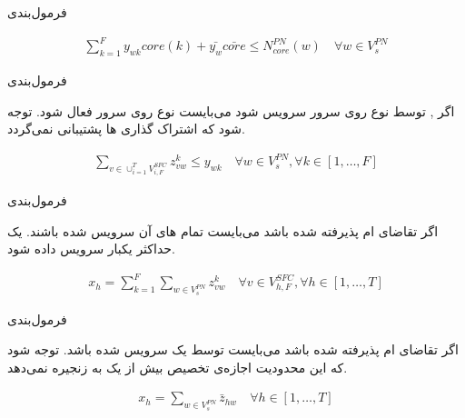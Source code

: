 \documentclass{beamer}
\begin{document}
\begin{persian}
\begin{frame}{فرمول‌بندی}
\begin{latin}
\begin{align}
    \sum_{k=1}^F y_{wk} core(k) + \bar{y_w} \bar{core} \le N_{core}^{PN}(w)
    \quad
    \forall w \in V_s^{PN}
    \end{align}\end{latin}
\end{frame}
\begin{frame}{فرمول‌بندی} %
    \par
    اگر , 
    توسط  نوع 
    روی سرور  سرویس شود می‌بایست
     نوع 
    روی سرور  فعال شود.
    توجه شود که
    اشتراک گذاری ها پشتیبانی نمی‌گردد.
    \begin{latin}\begin{align}
    \sum_{v \in \cup_{i=1}^T V_{i, F}^{SFC}} z_{vw}^k \le y_{wk}
    \quad
    \forall w \in V_s^{PN}, \forall k \in [1,\ldots, F]
    \end{align}\end{latin}
\end{frame}
\begin{frame}{فرمول‌بندی} %
    \par
    اگر تقاضای ام پذیرفته شده باشد
    می‌بایست تمام های آن‌
    سرویس شده باشند.
    یک  حداکثر یکبار سرویس داده شود.
    \begin{latin}\begin{align}
        x_h = \sum_{k=1}^{F} \sum_{w \in V_{s}^{PN}} z_{vw}^{k}
        \quad
        \forall v \in V_{h,F}^{SFC}, \forall h \in [1,\ldots, T]
    \end{align}\end{latin}
\end{frame}
\begin{frame}{فرمول‌بندی} %
    \par
    اگر تقاضای ام پذیرفته شده باشد
    می‌بایست توسط یک  سرویس شده باشد.
    توجه شود که این محدودیت اجازه‌ی تخصیص بیش از یک 
    به زنجیره نمی‌دهد.
    \begin{latin}\begin{align}
        x_h = \sum_{w \in V_{s}^{PN}} \bar{z}_{hw}
        \quad
        \forall h \in [1,\ldots, T]
    \end{align}\end{latin}
\end{frame}

\end{persian}
\end{document}
